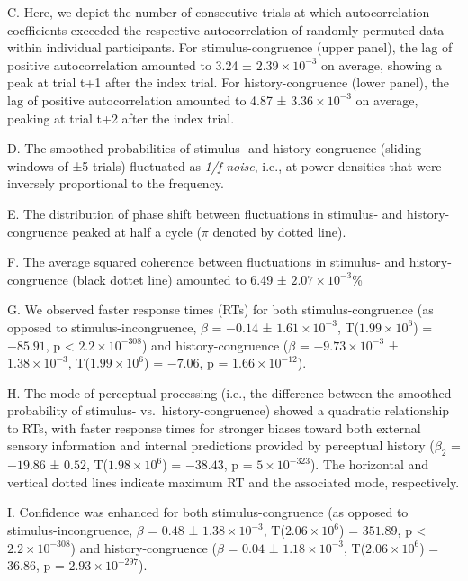 \documentclass[
]{article}
\begin{document}
C. Here, we depict the number of consecutive trials at which
autocorrelation coefficients exceeded the respective autocorrelation of
randomly permuted data within individual participants. For
stimulus-congruence (upper panel), the lag of positive autocorrelation
amounted to 3.24 ± \ensuremath{2.39\times 10^{-3}} on average, showing a
peak at trial t+1 after the index trial. For history-congruence (lower
panel), the lag of positive autocorrelation amounted to 4.87 ±
\ensuremath{3.36\times 10^{-3}} on average, peaking at trial t+2 after
the index trial.

D. The smoothed probabilities of stimulus- and history-congruence
(sliding windows of ±5 trials) fluctuated as \emph{1/f noise}, i.e., at
power densities that were inversely proportional to the frequency.

E. The distribution of phase shift between fluctuations in stimulus- and
history-congruence peaked at half a cycle (\(\pi\) denoted by dotted
line).

F. The average squared coherence between fluctuations in stimulus- and
history-congruence (black dottet line) amounted to 6.49 ±
\ensuremath{2.07\times 10^{-3}}\%

G. We observed faster response times (RTs) for both stimulus-congruence
(as opposed to stimulus-incongruence, \(\beta\) = \(-0.14\) ±
\(\ensuremath{1.61\times 10^{-3}}\),
T(\(\ensuremath{1.99\times 10^{6}}\)) = \(-85.91\), p < \(\ensuremath{2.2\times 10^{-308}}\)) and
history-congruence (\(\beta\) = \(\ensuremath{-9.73\times 10^{-3}}\) ±
\(\ensuremath{1.38\times 10^{-3}}\),
T(\(\ensuremath{1.99\times 10^{6}}\)) = \(-7.06\), p =
\(\ensuremath{1.66\times 10^{-12}}\)).

H. The mode of perceptual processing (i.e., the difference between the
smoothed probability of stimulus- vs.~history-congruence) showed a
quadratic relationship to RTs, with faster response times for stronger
biases toward both external sensory information and internal predictions
provided by perceptual history (\(\beta_2\) = \(-19.86\) ± \(0.52\),
T(\(\ensuremath{1.98\times 10^{6}}\)) = \(-38.43\), p =
\(\ensuremath{5\times 10^{-323}}\)). The horizontal and vertical dotted
lines indicate maximum RT and the associated mode, respectively.

I. Confidence was enhanced for both stimulus-congruence (as opposed to
stimulus-incongruence, \(\beta\) = \(0.48\) ±
\(\ensuremath{1.38\times 10^{-3}}\),
T(\(\ensuremath{2.06\times 10^{6}}\)) = \(351.89\), p < \(\ensuremath{2.2\times 10^{-308}}\)) and
history-congruence (\(\beta\) = \(0.04\) ±
\(\ensuremath{1.18\times 10^{-3}}\),
T(\(\ensuremath{2.06\times 10^{6}}\)) = \(36.86\), p =
\(\ensuremath{2.93\times 10^{-297}}\)).
\end{document}
